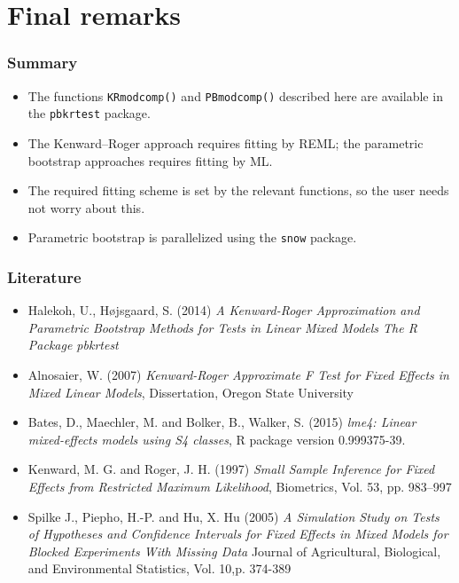 \section{Final remarks}
\label{sec:final-remarks}

\begin{sframe}
  \frametitle{Summary}

  \begin{itemize}
  \item   The functions \verb'KRmodcomp()' and \verb'PBmodcomp()' 
    described here are available in the \verb+pbkrtest+ package.

    
  \item The Kenward--Roger approach requires fitting by REML; the parametric
  bootstrap approaches requires fitting by ML.


\item The required fitting scheme is set by the relevant functions, so the
  user needs not worry about this.


\item Parametric bootstrap is parallelized using the \verb'snow'
  package. 
  
  \end{itemize}
  

\end{sframe}


\begin{sframe}
  \frametitle{Literature}

\begin{itemize}
\item Halekoh, U., H{\o}jsgaard, S. (2014)
\textit{ 	A Kenward-Roger Approximation and Parametric Bootstrap Methods for Tests in Linear Mixed Models The R Package pbkrtest}
\item
Alnosaier, W. (2007) 
\textit{Kenward-Roger Approximate F Test for Fixed Effects in Mixed Linear Models}, Dissertation, Oregon State University  
\item
Bates, D., Maechler, M.  and Bolker, B., Walker, S. (2015)
\textit{lme4: Linear mixed-effects models using S4 classes},
R package version 0.999375-39.
\item
Kenward,  M. G. and Roger, J. H. (1997)
\textit{Small Sample Inference for Fixed Effects from Restricted Maximum Likelihood},
Biometrics, Vol. 53, pp. 983--997                    
\item
Spilke J., Piepho, H.-P. and Hu, X. Hu (2005)
\textit{A Simulation Study on Tests of Hypotheses
and Confidence Intervals for Fixed Effects in
Mixed Models for Blocked Experiments With
Missing Data}
Journal of Agricultural, Biological, and Environmental Statistics,
Vol. 10,p. 374-389
\end{itemize}
\end{sframe}

